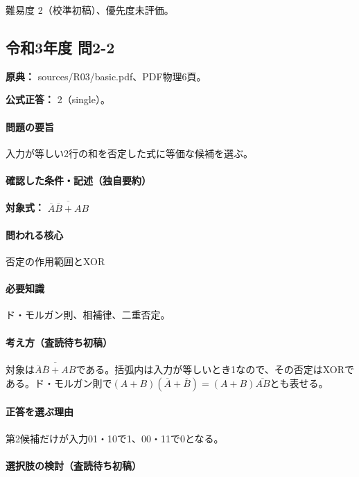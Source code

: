 \par 難易度 2（校準初稿）、優先度未評価。

\subsection{令和3年度 問2-2}
\label{q:r03-reg-basic-2-2}

\noindent\textbf{原典：} sources/R03/basic.pdf、PDF物理6頁。

\textbf{公式正答：} 2（single）。

\paragraph{問題の要旨} 入力が等しい2行の和を否定した式に等価な候補を選ぶ。

\paragraph{確認した条件・記述（独自要約）}\mbox{}\par

\noindent\textbf{対象式：} \(\overline{\overline A\overline B+AB}\)\par

\paragraph{問われる核心} 否定の作用範囲とXOR

\paragraph{必要知識} ド・モルガン則、相補律、二重否定。

\paragraph{考え方（査読待ち初稿）} 対象は\(\overline{\overline A\overline B+AB}\)である。括弧内は入力が等しいとき1なので、その否定はXORである。ド・モルガン則で\((A+B)(\overline A+\overline B)=(A+B)\overline{AB}\)とも表せる。

\paragraph{正答を選ぶ理由} 第2候補だけが入力01・10で1、00・11で0となる。

\paragraph{選択肢の検討（査読待ち初稿）}\mbox{}\par

